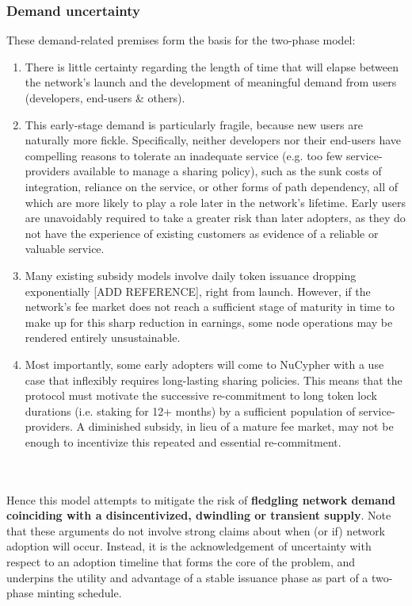 \documentclass[longbibliography,nofootinbib]{revtex4-1}
\begin{document}
\subsubsection{Demand uncertainty}\label{demand}

These demand-related premises form the basis for the two-phase model: 
\begin{enumerate}
\item There is little certainty regarding the length of time that will elapse between the network's launch and the development of meaningful demand from users (developers, end-users \& others).
\item This early-stage demand is particularly fragile, because new users are naturally more fickle. Specifically, neither developers nor their end-users have compelling reasons to tolerate an inadequate service (e.g. too few service-providers available to manage a sharing policy), such as the sunk costs of integration, reliance on the service, or other forms of path dependency, all of which are more likely to play a role later in the network's lifetime. Early users are unavoidably required to take a greater risk than later adopters, as they do not have the experience of existing customers as evidence of a reliable or valuable service.
\item Many existing subsidy models involve daily token issuance dropping exponentially [ADD REFERENCE], right from launch. However, if the network's fee market does not reach a sufficient stage of maturity in time to make up for this sharp reduction in earnings, some node operations may be rendered entirely unsustainable. 
\item Most importantly, some early adopters will come to NuCypher with a use case that inflexibly requires long-lasting sharing policies. This means that the protocol must motivate the successive re-commitment to long token lock durations (i.e. staking for 12+ months) by a sufficient population of service-providers. A diminished subsidy, in lieu of a mature fee market, may not be enough to incentivize this repeated and essential re-commitment. 
\end{enumerate}

\\\\
Hence this model attempts to mitigate the risk of \textbf{fledgling network demand coinciding with a disincentivized, dwindling or transient supply}. Note that these arguments do not involve strong claims about when (or if) network adoption will occur. Instead, it is the acknowledgement of uncertainty with respect to an adoption timeline that forms the core of the problem, and underpins the utility and advantage of a stable issuance phase as part of a two-phase minting schedule. 
\end{document}
